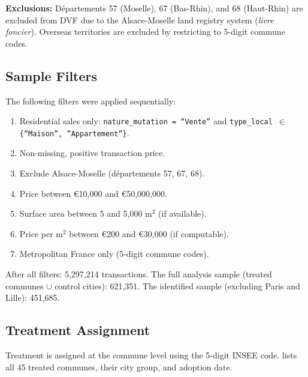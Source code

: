 \documentclass[12pt]{article}
\begin{document}
\textbf{Exclusions:} D\'epartements 57 (Moselle), 67 (Bas-Rhin), and 68 (Haut-Rhin) are excluded from DVF due to the Alsace-Moselle land registry system (\emph{livre foncier}). Overseas territories are excluded by restricting to 5-digit commune codes.

\subsection{Sample Filters}

The following filters were applied sequentially:
\begin{enumerate}
\item Residential sales only: \texttt{nature\_mutation = ``Vente''} and \texttt{type\_local $\in$ \{``Maison'', ``Appartement''\}}.
\item Non-missing, positive transaction price.
\item Exclude Alsace-Moselle (d\'epartements 57, 67, 68).
\item Price between \euro{10,000} and \euro{50,000,000}.
\item Surface area between 5 and 5,000 m$^2$ (if available).
\item Price per m$^2$ between \euro{200} and \euro{30,000} (if computable).
\item Metropolitan France only (5-digit commune codes).
\end{enumerate}

After all filters: 5,297,214 transactions. The full analysis sample (treated communes $\cup$ control cities): 621,351. The identified sample (excluding Paris and Lille): 451,685.

\subsection{Treatment Assignment}

Treatment is assigned at the commune level using the 5-digit INSEE code.  lists all 45 treated communes, their city group, and adoption date.
\end{document}
